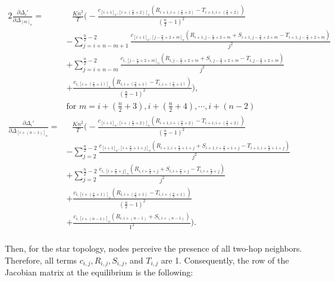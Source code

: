 \begin{alignat}{2}
\frac{\partial \Delta_i'}{\partial \Delta_{[m]_n}} =& \text{ }\frac{Kn^2}{T} \Bigg(- \frac{c_{[i+1]_n,[i+(\frac{n}{2}+2)]_n}(R_{i+1,i+(\frac{n}{2}+2)} - T_{i+1,i+(\frac{n}{2}+2)})}{(\frac{n}{2}-1)^2} \nonumber \\
  &- \sum_{j= i + n -m + 1}^{\frac{n}{2}-2}  \frac{c_{[i+1]_n,[j-\frac{n}{2}+2+m]_n}(R_{i+1,j-\frac{n}{2}+2+m} + S_{i+1,j-\frac{n}{2}+2+m} - T_{i+1,j-\frac{n}{2}+2+m})}{j^2} \nonumber \\
  &+ \sum_{j= i + n - m}^{\frac{n}{2}-2}  \frac{c_{i,[j-\frac{n}{2}+2+m]_n}(R_{i,j-\frac{n}{2}+2+m} + S_{i,j-\frac{n}{2}+2+m} - T_{i,j-\frac{n}{2}+2+m})}{j^2} \nonumber \\
  &+ \frac{c_{i,[i+(\frac{n}{2}+1)]_n}(R_{i,i+(\frac{n}{2}+1)} - T_{i,i+(\frac{n}{2}+1)})}{(\frac{n}{2}-1)^2}\Bigg), \nonumber \\
  &\text{for } m = i+(\frac{n}{2}+3), i+(\frac{n}{2}+4), \cdots, i + (n-2) \nonumber \\
\frac{\partial \Delta_i'}{\partial \Delta_{[i+(n-1)]_n}} =& \text{ }\frac{Kn^2}{T} \Bigg(- \frac{c_{[i+1]_n,[i+(\frac{n}{2}+2)]_n}(R_{i+1,i+(\frac{n}{2}+2)} - T_{i+1,i+(\frac{n}{2}+2)})}{(\frac{n}{2}-1)^2} \nonumber \\
  &- \sum_{j= 2}^{\frac{n}{2}-2}  \frac{c_{[i+1]_n,[i+\frac{n}{2}+1+j]_n}(R_{i+1,i+\frac{n}{2}+1+j} + S_{i+1,i+\frac{n}{2}+1+j} - T_{i+1,i+\frac{n}{2}+1+j})}{j^2} \nonumber \\
  &+ \sum_{j=2}^{\frac{n}{2}-2}  \frac{c_{i,[i+\frac{n}{2}+j]_n}(R_{i,i+\frac{n}{2}+j} + S_{i,i+\frac{n}{2}+j} - T_{i,i+\frac{n}{2}+j})}{j^2} \nonumber \\
  &+ \frac{c_{i,[i+(\frac{n}{2}+1)]_n}(R_{i,i+(\frac{n}{2}+1)} - T_{i,i+(\frac{n}{2}+1)})}{(\frac{n}{2}-1)^2} \nonumber \\
  &+ \frac{c_{i,[i+(n-1)]_n}(R_{i,i+(n-1)} + S_{i,i+(n-1)})}{1^2} \Bigg) \nonumber. \\
\label{eq:startndiff}
\end{alignat}

Then, for the star topology, nodes perceive the presence of all two-hop neighbors. Therefore, all terms $c_{i,j}, R_{i,j}, S_{i,j}$, and $T_{i,j}$ are 1. Consequently, the row of the Jacobian matrix at the equilibrium is the following: 

